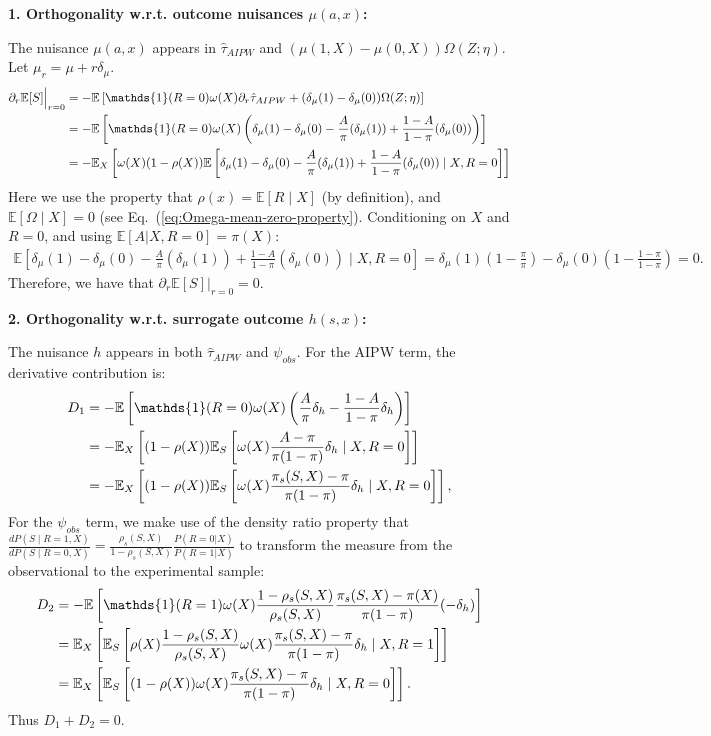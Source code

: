 \documentclass{article}
\theoremstyle{plain}
\theoremstyle{definition}
\theoremstyle{remark}
\newcommand{\E}{\mathbb{E}}                %
\newcommand{\1}{\mathds{1}}                %
\begin{document}
\textbf{1. Orthogonality w.r.t. outcome nuisances $\mu(a,x)$:}

The nuisance $\mu(a,x)$ appears in $\hat{\tau}_{AIPW}$ and $(\mu(1,X)-\mu(0,X)) \Omega(Z;\eta)$. Let $\mu_r = \mu + r\delta_\mu$.
\begin{align}
    \partial_r \mathbb{E}[S]\Big|_{r=0} &= -\mathbb{E}\left[ \1(R=0)\omega(X) \partial_r \hat{\tau}_{AIPW} + (\delta_\mu(1) - \delta_\mu(0))\Omega(Z;\eta)\right] \notag \\
    &= -\mathbb{E}\left[ \1(R=0)\omega(X) \left( \delta_\mu(1) - \delta_\mu(0) - \frac{A}{\pi}(\delta_\mu(1)) + \frac{1-A}{1-\pi}(\delta_\mu(0)) \right) \right] \notag \\
    &= -\mathbb{E}_X\left[ \omega(X) (1-\rho(X))\E\left[ \delta_\mu(1) - \delta_\mu(0) - \frac{A}{\pi}(\delta_\mu(1)) + \frac{1-A}{1-\pi}(\delta_\mu(0)) \mid X, R=0 \right] \right]
\end{align}
Here we use the property that $\rho(x)=\E[R\mid X]$ (by definition), and $\E\left[\Omega \mid X\right]=0$ (see Eq.~(\ref{eq:Omega-mean-zero-property}). Conditioning on $X$ and $R=0$, and using $\mathbb{E}[A|X, R=0]=\pi(X)$:
\begin{align}
    \mathbb{E}[ \delta_\mu(1) - \delta_\mu(0) - \frac{A}{\pi}(\delta_\mu(1)) + \frac{1-A}{1-\pi}(\delta_\mu(0)) \mid X, R=0 ] = \delta_\mu(1)(1 - \frac{\pi}{\pi}) - \delta_\mu(0)(1 - \frac{1-\pi}{1-\pi}) = 0.
\end{align}
Therefore, we have that $\partial_r \mathbb{E}[S]\Big|_{r=0} = 0$.


\textbf{2. Orthogonality w.r.t. surrogate outcome $h(s,x)$:}

The nuisance $h$ appears in both $\hat{\tau}_{AIPW}$ and $\psi_{obs}$.
For the AIPW term, the derivative contribution is:
\begin{align}
    D_1 &= -\mathbb{E}\left[ \1(R=0)\omega(X) \left( \frac{A}{\pi}\delta_h - \frac{1-A}{1-\pi}\delta_h \right) \right] \notag \\
    &= -\E_X\left[(1-\rho(X))\mathbb{E}_S\left[ \omega(X) \frac{A - \pi}{\pi(1-\pi)} \delta_h \mid X, R=0\right]\right] \notag \\
    &= -\mathbb{E}_X\left[ (1-\rho(X))\E_{S}\left[\omega(X) \frac{\pi_s(S,X) - \pi}{\pi(1-\pi)} \delta_h \mid X, R=0\right]\right],
\end{align}
For the $\psi_{obs}$ term,  we make use of the density ratio property that $\frac{dP(S \mid R=1, X)}{dP(S \mid R=0, X)} = \frac{\rho_s(S,X)}{1-\rho_s(S,X)} \frac{P(R=0|X)}{P(R=1|X)}$ to transform the measure from the observational to the experimental sample:
\begin{align}
    D_2 &= -\mathbb{E}\left[ \1(R=1)\omega(X) \frac{1-\rho_s(S,X)}{\rho_s(S,X)} \frac{\pi_s(S,X)-\pi(X)}{\pi(1-\pi)} (-\delta_h) \right] \notag \\
    &= \mathbb{E}_{X}\left[\E_S\left[ \rho(X) \frac{1-\rho_s(S,X)}{\rho_s(S,X)} \omega(X) \frac{\pi_s(S,X) - \pi}{\pi(1-\pi)} \delta_h \mid X, R=1 \right]\right] \notag \\
    &=\mathbb{E}_{X}\left[\E_S\left[(1-\rho(X))\omega(X) \frac{\pi_s(S,X) - \pi}{\pi(1-\pi)} \delta_h \mid X, R=0\right]\right].
\end{align}
Thus $D_1 + D_2 = 0$.
\end{document}
